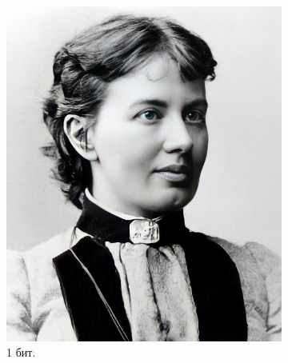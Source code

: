 \documentclass[11pt,a4paper,final]{article} %
\begin{document}
\begin{figure}[h!]
	\centering
	\begin{subfigure}[b]{0.3\linewidth}
		\centering
		\includegraphics[width=\linewidth]{img/sofya-1-5.png}
		\caption{1 бит.}
		\label{fig:p1}
	\end{subfigure}
	\hfill
	\begin{subfigure}[b]{0.3\linewidth}
		\centering

\end{subfigure}
\end{figure}
\end{document}
